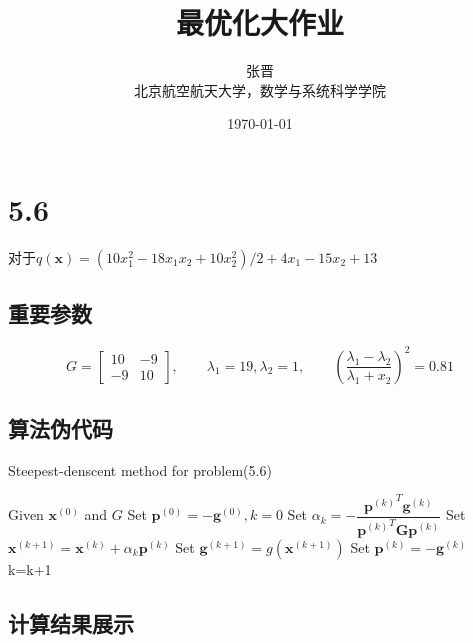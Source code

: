 

\title{\heiti 最优化大作业}
\author{\kaishu 张晋\\
				\kaishu 北京航空航天大学，数学与系统科学学院}
\date{\today}


\maketitle
\tableofcontents

\newpage
\section{5.6}
对于$q(\bm{x})=(10x_1^2-18x_1x_2+10x_2^2)/2+4x_1-15x_2+13$

\subsection{重要参数}

\[G=\begin{bmatrix}
10&-9\\
-9&10
\end{bmatrix},\qquad \lambda_1=19,\lambda_2=1,\qquad (\dfrac {\lambda_{1}-\lambda_{2}}{\lambda_{1}+x_{2}})^2 =0.81\]

\subsection{算法伪代码}
\begin{algorithm}[h]  
\caption{Steepest-denscent method for problem(5.6)}  
\begin{algorithmic}[1]  
\STATE Given $\bm{x}^{(0)}$ and $G$
\STATE Set $\bm{p}^{(0)}=-\bm{g}^{(0)},k=0$
\STATE Set $\alpha_k=-\dfrac{{{\bm{p}^{(k)}}^T}\bm{g}^{(k)}}{{\bm{p}^{(k)}}^T\bm{G}\bm{p}^{(k)}}$
\STATE Set $\bm{x}^{(k+1)}=\bm{x}^{(k)}+\alpha_k\bm{p}^{(k)}$
\STATE Set $\bm{g}^{(k+1)}=g(\bm{x}^{(k+1)})$
\STATE Set $\bm{p}^{(k)}=-\bm{g}^{(k)}$
\STATE k=k+1
\ENDWHILE
\end{algorithmic}  
\end{algorithm}  

\subsection{计算结果展示}

